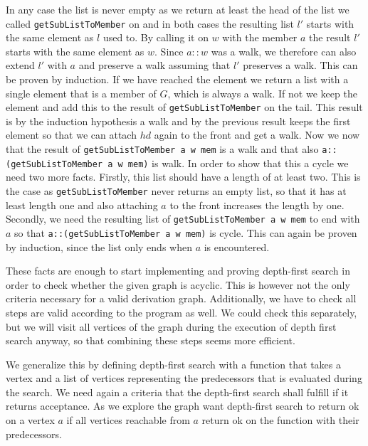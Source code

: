 \documentclass{article}
\begin{document}
        In any case the list is never empty as we return at least the head of the list we called \texttt{getSubListToMember} on and in both cases the resulting list $l'$ starts with the same element as $l$ used to. By calling it on $w$ with the member $a$ the result $l'$ starts with the same element as $w$. Since $a::w$ was a walk, we therefore can also extend $l'$ with $a$ and preserve a walk assuming that $l'$ preserves a walk. This can be proven by induction. If we have reached the element we return a list with a single element that is a member of $G$, which is always a walk. If not we keep the element and add this to the result of \texttt{getSubListToMember} on the tail. This result is by the induction hypothesis a walk and by the previous result keeps the first element so that we can attach $hd$ again to the front and get a walk. Now we now that the result of \texttt{getSubListToMember a w mem} is a walk and that also \texttt{a::(getSubListToMember a w mem)} is walk. 
        In order to show that this a cycle we need two more facts. Firstly, this list should have a length of at least two. This is the case as \texttt{getSubListToMember} never returns an empty list, so that it has at least length one and also attaching $a$ to the front increases the length by one. Secondly, we need the resulting list of \texttt{getSubListToMember a w mem} to end with $a$ so that \texttt{a::(getSubListToMember a w mem)} is cycle. This can again be proven by induction, since the list only ends when $a$ is encountered. 

        These facts are enough to start implementing and proving depth-first search in order to check whether the given graph is acyclic. This is however not the only criteria necessary for a valid derivation graph. Additionally, we have to check all steps are valid according to the program as well. We could check this separately, but we will visit all vertices of the graph during the execution of depth first search anyway, so that combining these steps seems more efficient. 

        We generalize this by defining depth-first search with a function that takes a vertex and a list of vertices representing the predecessors that is evaluated during the search. We need again a criteria that the depth-first search shall fulfill if it returns acceptance. As we explore the graph want depth-first search to return ok on a vertex $a$ if all vertices reachable from $a$ return ok on the function with their predecessors.
\end{document}
